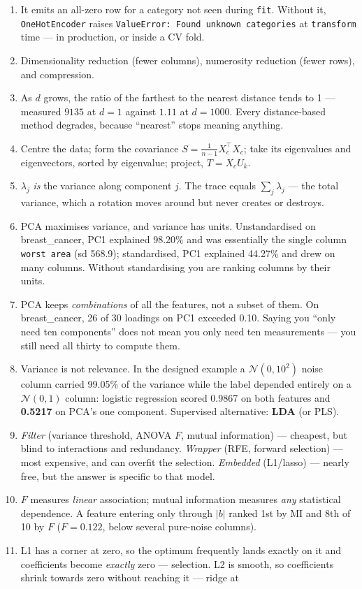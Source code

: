 \documentclass[11pt,a4paper]{article}
\newcommand{\A}[1]{\item[\textbf{#1}]}
\begin{document}
\begin{enumerate}[leftmargin=1.9cm]
\A{U4.26} It emits an all-zero row for a category not seen during
\texttt{fit}. Without it, \texttt{OneHotEncoder} raises
\texttt{ValueError: Found unknown categories} at \texttt{transform} time --- in
production, or inside a CV fold.
\A{U4.27} Dimensionality reduction (fewer columns), numerosity reduction (fewer
rows), and compression.
\A{U4.28} As $d$ grows, the ratio of the farthest to the nearest distance tends
to 1 --- measured $9135$ at $d=1$ against $1.11$ at $d=1000$. Every
distance-based method degrades, because ``nearest'' stops meaning anything.
\A{U4.29} Centre the data; form the covariance
$S = \frac{1}{n-1}X_c^\top X_c$; take its eigenvalues and eigenvectors, sorted
by eigenvalue; project, $T = X_c U_k$.
\A{U4.30} $\lambda_j$ \emph{is} the variance along component $j$. The trace
equals $\sum_j \lambda_j$ --- the total variance, which a rotation moves
around but never creates or destroys.
\A{U4.31} PCA maximises variance, and variance has units. Unstandardised on
breast\_cancer, PC1 explained 98.20\% and was essentially the single column
\texttt{worst area} (sd 568.9); standardised, PC1 explained 44.27\% and drew on
many columns. Without standardising you are ranking columns by their units.
\A{U4.32} PCA keeps \emph{combinations} of all the features, not a subset of
them. On breast\_cancer, 26 of 30 loadings on PC1 exceeded 0.10. Saying you
``only need ten components'' does not mean you only need ten measurements ---
you still need all thirty to compute them.
\A{U4.33} Variance is not relevance. In the designed example a $\mathcal
N(0,10^2)$ noise column carried 99.05\% of the variance while the label
depended entirely on a $\mathcal N(0,1)$ column: logistic regression scored
0.9867 on both features and \textbf{0.5217} on PCA's one component. Supervised
alternative: \textbf{LDA} (or PLS).
\A{U4.34} \emph{Filter} (variance threshold, ANOVA $F$, mutual information) ---
cheapest, but blind to interactions and redundancy. \emph{Wrapper} (RFE, forward
selection) --- most expensive, and can overfit the selection.
\emph{Embedded} (L1/lasso) --- nearly free, but the answer is specific to that
model.
\A{U4.35} $F$ measures \emph{linear} association; mutual information measures
\emph{any} statistical dependence. A feature entering only through $|b|$ ranked
1st by MI and 8th of 10 by $F$ ($F = 0.122$, below several pure-noise columns).
\A{U4.36} L1 has a corner at zero, so the optimum frequently lands exactly on
it and coefficients become \emph{exactly} zero --- selection. L2 is smooth, so
coefficients shrink towards zero without reaching it --- ridge at

\end{enumerate}
\end{document}
